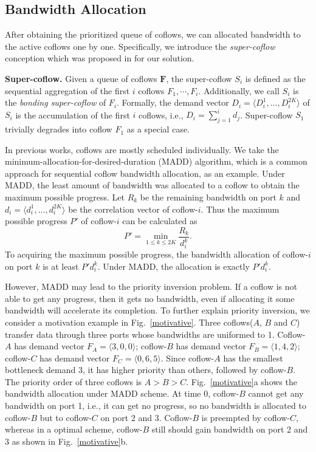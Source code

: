 \documentclass[10pt, conference, letterpaper]{IEEEtran}
\begin{document}
\subsection{Bandwidth Allocation}
After obtaining the prioritized queue of coflows, we can allocated bandwidth to the active coflows one by one. Specifically, we introduce the \emph{super-coflow} conception which was proposed in \cite{utopia} for our solution.

\noindent \textbf{Super-coflow.} Given a queue of coflows $\mathbf{F}$, the super-coflow $S_i$ is defined as the sequential aggregation of the first $i$ coflows $F_1,\cdots,F_i$. Additionally, we call $S_i$ is the \emph{bonding super-coflow} of $F_i$. Formally, the demand vector $D_i = \langle D_i^1,\dots,D_i^{2K} \rangle$ of $S_i$ is the accumulation of the first $i$ coflows, i.e., $D_i = \sum_{j=1}^id_j$. Super-coflow $S_1$ trivially degrades into coflow $F_1$ as a special case.

In previous works, coflows are mostly scheduled individually. We take the minimum-allocation-for-desired-duration (MADD) algorithm, which is a common approach for sequential coflow bandwidth allocation, as an example\cite{varys, orchestra}. Under MADD, the least amount of bandwidth was allocated to a coflow to obtain the maximum possible progress. Let $R_k$ be the remaining bandwidth on port $k$ and $d_i=\langle d_i^1,\dots,d_i^{2K}\rangle$ be the correlation vector of coflow-$i$. Thus the maximum possible progress $P'$ of coflow-$i$ can be calculated as
\begin{equation}
	P' = \min_{1\leq k \leq 2K}\frac{R_k}{d_i^k}.
\end{equation}
To acquiring the maximum possible progress, the bandwidth allocation of coflow-$i$ on port $k$ is at least $P'd_i^k$. Under MADD, the allocation is exactly $P'd_i^k$. 

However, MADD may lead to the priority inversion problem. If a coflow is not able to get any progress, then it gets no bandwidth, even if allocating it some bandwidth will accelerate its completion. To further explain priority inversion, we consider a motivation example in Fig.~\ref{motivative}. Three coflows($A$, $B$ and $C$) transfer data through three ports whose bandwidths are uniformed to 1. Coflow-$A$ has demand vector $F_A=\langle 3,0,0\rangle$; coflow-$B$ has demand vector $F_B=\langle 1,4,2\rangle$; coflow-$C$ has demand vector $F_C=\langle 0,6,5\rangle$. Since coflow-$A$ has the smallest bottleneck demand 3, it has higher priority than others, followed by coflow-$B$. The priority order of three coflows is $A > B > C$. Fig.~\ref{motivative}a shows the bandwidth allocation under MADD scheme. At time 0, coflow-$B$ cannot get any bandwidth on port 1, i.e., it can get no progress, so no bandwidth is allocated to coflow-$B$ but to coflow-$C$ on port 2 and 3. Coflow-$B$ is preempted by coflow-$C$, whereas in a optimal scheme, coflow-$B$ still should gain bandwidth on port 2 and 3 as shown in Fig.~\ref{motivative}b.
\end{document}
